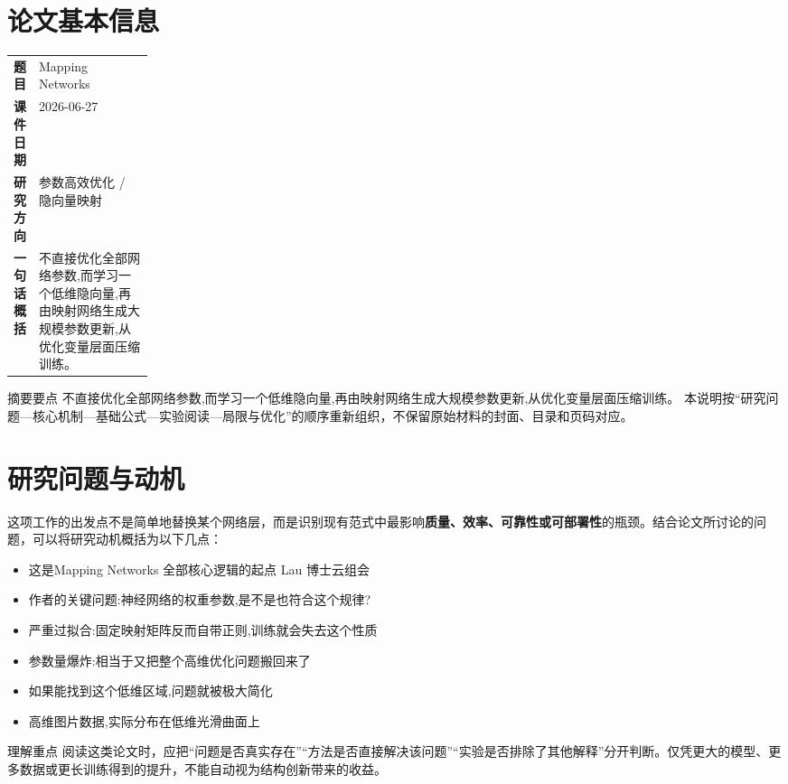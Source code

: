 \documentclass[UTF8,11pt,a4paper]{ctexart}
\newcommand{\term}[1]{\textbf{\textcolor{mainblue}{#1}}}
\begin{document}
\section{论文基本信息}
\begin{center}
\begin{tabularx}{0.94\linewidth}{>{\bfseries}p{0.18\linewidth}X}
\toprule
题目 & Mapping Networks\\
课件日期 & 2026-06-27\\
研究方向 & 参数高效优化 / 隐向量映射\\
一句话概括 & 不直接优化全部网络参数,而学习一个低维隐向量,再由映射网络生成大规模参数更新,从优化变量层面压缩训练。\\
\bottomrule
\end{tabularx}
\end{center}

\begin{infobox}{摘要要点}
不直接优化全部网络参数,而学习一个低维隐向量,再由映射网络生成大规模参数更新,从优化变量层面压缩训练。 本说明按“研究问题—核心机制—基础公式—实验阅读—局限与优化”的顺序重新组织，不保留原始材料的封面、目录和页码对应。
\end{infobox}

\section{研究问题与动机}
这项工作的出发点不是简单地替换某个网络层，而是识别现有范式中最影响\term{质量、效率、可靠性或可部署性}的瓶颈。结合论文所讨论的问题，可以将研究动机概括为以下几点：
\begin{itemize}
\item 这是Mapping Networks 全部核心逻辑的起点 Lau 博士云组会
\item 作者的关键问题:神经网络的权重参数,是不是也符合这个规律?
\item 严重过拟合:固定映射矩阵反而自带正则,训练就会失去这个性质
\item 参数量爆炸:相当于又把整个高维优化问题搬回来了
\item 如果能找到这个低维区域,问题就被极大简化
\item 高维图片数据,实际分布在低维光滑曲面上
\end{itemize}

\begin{notebox}{理解重点}
阅读这类论文时，应把“问题是否真实存在”“方法是否直接解决该问题”“实验是否排除了其他解释”分开判断。仅凭更大的模型、更多数据或更长训练得到的提升，不能自动视为结构创新带来的收益。
\end{notebox}
\end{document}
